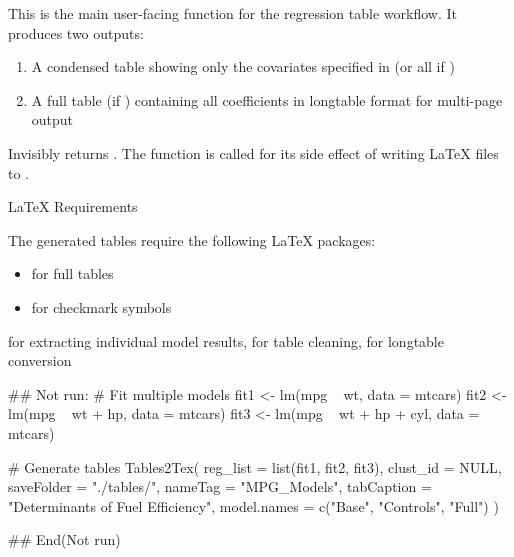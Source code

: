 \documentclass[a4paper]{book}
\begin{document}
%
\begin{Details}
This is the main user-facing function for the regression table workflow.
It produces two outputs:
\begin{enumerate}

\item{} A condensed table showing only the covariates specified in
 (or all if )
\item{} A full table (if ) containing all coefficients
in longtable format for multi-page output

\end{enumerate}

\end{Details}
%
\begin{Value}
Invisibly returns . The function is called for its side
effect of writing LaTeX files to .
\end{Value}
%
\begin{Section}{LaTeX Requirements}

The generated tables require the following LaTeX packages:
\begin{itemize}

\item{}  for full tables
\item{}  for checkmark symbols

\end{itemize}

\end{Section}
%
\begin{SeeAlso}
 for extracting individual model results,
 for table cleaning,
 for longtable conversion
\end{SeeAlso}
%
\begin{Examples}
\begin{ExampleCode}
## Not run: 
# Fit multiple models
fit1 <- lm(mpg ~ wt, data = mtcars)
fit2 <- lm(mpg ~ wt + hp, data = mtcars)
fit3 <- lm(mpg ~ wt + hp + cyl, data = mtcars)

# Generate tables
Tables2Tex(
  reg_list = list(fit1, fit2, fit3),
  clust_id = NULL,
  saveFolder = "./tables/",
  nameTag = "MPG_Models",
  tabCaption = "Determinants of Fuel Efficiency",
  model.names = c("Base", "Controls", "Full")
)

## End(Not run)

\end{ExampleCode}
\end{Examples}
\end{document}

